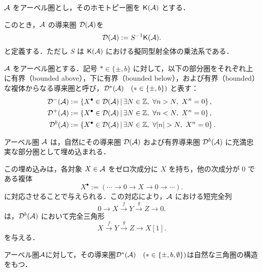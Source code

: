 \begin{defn}[導来圏]
${\mathcal A}$ をアーベル圏とし，そのホモトピー圏を $\mathsf{K}({\mathcal A})$ とする．

このとき，${\mathcal A}$ の導来圏 ${\mathcal D}({\mathcal A})$を
\[
{\mathcal D}({\mathcal A}) := S^{-1} \mathsf{K}({\mathcal A}).
\]
と定義する．ただし $S$ は $\mathsf{K}({\mathcal A})$ における擬同型射全体の乗法系である．
\end{defn}

\begin{defn}
	${\mathcal A}$ をアーベル圏とする．記号 $* \in \{\pm,b\}$ に対して，以下の部分圏をそれぞれ上に有界（bounded above），下に有界（bounded below），および有界（bounded）な複体からなる導来圏と呼び，${\mathcal D}^*({\mathcal A})\quad (*\in \{\pm,b\})$ と表す：
\begin{align*}
	\D^{-}(\A) &:= \left\{ X^\bullet \in \D(\A) \,\middle|\, \exists N \in \mathbb{Z},\ \forall n>N,\  X^n = 0\right\}, \\
	\D^{+}(\A) &:= \left\{ X^\bullet \in \D(\A) \,\middle|\, \exists N \in \mathbb{Z},\ \forall n<N,\  X^n = 0 \right\}, \\
	\D^{b}(\A) &:= \left\{ X^\bullet \in \D(\A) \,\middle|\, \exists N \in \mathbb{Z},\ \forall |n|>N,\  X^n = 0   \right\}.
\end{align*}
\end{defn}

\begin{prop}\cite{KS06}
アーベル圏 ${\mathcal A}$ は，自然にその導来圏 ${\mathcal D}({\mathcal A})$ および有界導来圏 ${\mathcal D}^b({\mathcal A})$ に充満忠実な部分圏として埋め込まれる．

この埋め込みは，各対象 $X \in {\mathcal A}$ をゼロ次成分に $X$ を持ち，他の次成分が $0$ である複体
\[
X^\bullet := (\cdots \to 0 \to X \to 0 \to \cdots).
\]
に対応させることで与えられる．この対応により，${\mathcal A}$ における短完全列
\[
0 \to X \xrightarrow{f} Y \xrightarrow{g} Z \to 0.
\]
は，${\mathcal D}^b({\mathcal A})$ において完全三角形
\[
X \xrightarrow{f} Y \xrightarrow{g} Z \to X[1].
\]
を与える．
\end{prop}

\begin{prop}\cite[p.320]{KS06}
	アーベル圏${\mathcal A}$に対して，その導来圏${\mathcal D}^*({\mathcal A})\quad (*\in \{\pm,b,\emptyset\})$は自然な三角圏の構造をもつ．
\end{prop}

